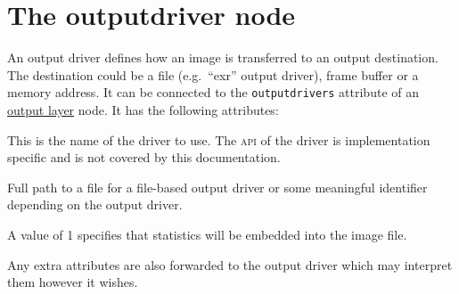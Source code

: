 \documentclass[oneside,ebook]{memoir}
\newcommand*{\acronym}[1]{\textsc{\lowercase{#1}}}
\newcommand{\paramlistitemTN}[2]{\item[#2\textcolor{lightgray}{\dotfill}#1]}
\newcommand{\paramlistitemTND}[3]{\paramlistitemTN{#1 {\rmfamily({\ttfamily#3})}}{#2}}
\begin{document}
\section{The outputdriver node}
\label{section:outputdrivernode}
An output driver defines how an image is transferred to an output destination. The destination could be a file (e.g.\ ``exr'' output driver), frame buffer or a memory address. It can be connected to the \lstinline|outputdrivers| attribute of an \hyperref[section:outputlayernode]{output layer} node. It has the following attributes:
\begin{paramlist}
\paramlistitemTN{string}{drivername}
This is the name of the driver to use. The \acronym{API} of the driver is implementation specific and is not covered by this documentation.
\paramlistitemTN{string}{imagefilename}
Full path to a file for a file-based output driver or some meaningful identifier depending on the output driver.
\paramlistitemTND{int}{embedstatistics}{1}
A value of 1 specifies that statistics will be embedded into the image file.
\end{paramlist}
Any extra attributes are also forwarded to the output driver which may interpret them however it wishes.
\end{document}
